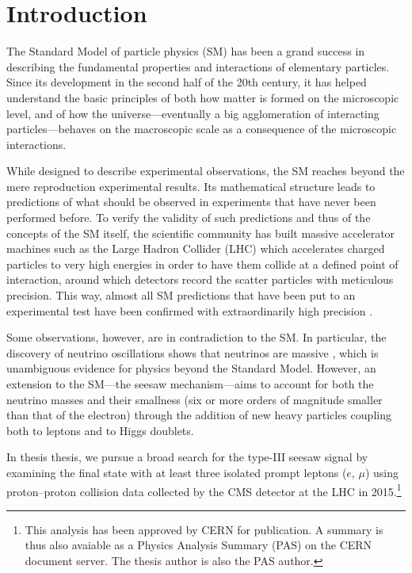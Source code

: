 \chapter{Introduction}
\label{sec:Introduction}

The Standard Model of particle physics (SM) \cite{i2003gauge,aitchison2003gauge,Peskin:257493} has been a grand success in describing the fundamental properties and interactions of elementary particles. Since its development in the second half of the 20th century, it has helped understand the basic principles of both how matter is formed on the microscopic level, and of how the universe\hairspace---\hairspace{}eventually a big agglomeration of interacting particles\hairspace---\hairspace{}behaves on the macroscopic scale as a consequence of the microscopic interactions.

While designed to describe experimental observations, the SM reaches beyond the mere reproduction experimental results. Its mathematical structure leads to predictions of what should be observed in experiments that have never been performed before. To verify the validity of such predictions and thus of the concepts of the SM itself, the scientific community has built massive accelerator machines such as the Large Hadron Collider (LHC) \cite{Evans:2008zzb} which accelerates charged particles to very high energies in order to have them collide at a defined point of interaction, around which detectors record the scatter particles with meticulous precision. This way, almost all SM predictions that have been put to an experimental test have been confirmed with extraordinarily high precision \cite{Agashe:2014kda}.

Some observations, however, are in contradiction to the SM. In particular, the discovery of neutrino oscillations shows that neutrinos are massive \cite{Nustatus}, which is unambiguous evidence for physics beyond the Standard Model. However, an extension to the SM\hairspace---\hairspace{}the seesaw mechanism\hairspace---\hairspace{}aims to account for both the neutrino masses and their smallness (six or more orders of magnitude smaller than that of the electron) through the addition of new heavy particles coupling both to leptons and to Higgs doublets.

In thesis thesis, we pursue a broad search for the type-III seesaw signal \cite{SeesawIII:a} by examining the final state with at least three isolated prompt leptons ($e$, $\mu$) using proton--proton collision data collected by the CMS detector \cite{Chatrchyan:2008zzk} at the LHC in 2015.\footnote{This analysis has been approved by CERN for publication. A summary is thus also avaiable as a Physics Analysis Summary (PAS) \cite{CMS-PAS-EXO-16-002} on the CERN document server. The thesis author is also the PAS author.}

